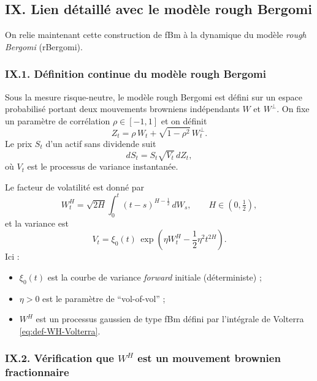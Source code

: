 \documentclass[11pt,a4paper]{article}
\newcommand{\1}{\mathbf{1}}
\begin{document}
\subsection*{IX. Lien détaillé avec le modèle rough Bergomi}

On relie maintenant cette construction de fBm à la dynamique du
modèle \emph{rough Bergomi} (rBergomi).

\subsubsection*{IX.1. Définition continue du modèle rough Bergomi}

Sous la mesure risque-neutre, le modèle rough Bergomi est défini
sur un espace probabilisé portant deux mouvements browniens
indépendants $W$ et $W^\perp$. On fixe un paramètre de corrélation
$\rho\in[-1,1]$ et on définit
\begin{equation}
  Z_t = \rho\,W_t + \sqrt{1-\rho^2}\,W_t^\perp.
\end{equation}
Le prix $S_t$ d'un actif sans dividende suit
\begin{equation}
  dS_t = S_t \sqrt{V_t}\,dZ_t,
\end{equation}
où $V_t$ est le processus de variance instantanée.

Le facteur de volatilité est donné par
\begin{equation}
  \label{eq:def-WH-Volterra}
  W_t^H = \sqrt{2H}\int_0^t (t-s)^{H-\frac12}\,dW_s,
  \qquad H\in(0,\tfrac12),
\end{equation}
et la variance est
\begin{equation}
  \label{eq:def-V-rBergomi}
  V_t = \xi_0(t)\,
        \exp\!\left(
          \eta W_t^H - \frac12 \eta^2 t^{2H}
        \right).
\end{equation}
Ici :
\begin{itemize}
  \item $\xi_0(t)$ est la courbe de variance \emph{forward} initiale
        (déterministe) ;
  \item $\eta>0$ est le paramètre de ``vol-of-vol'' ;
  \item $W^H$ est un processus gaussien de type fBm défini par
        l'intégrale de Volterra \eqref{eq:def-WH-Volterra}.
\end{itemize}

\subsubsection*{IX.2. Vérification que $W^H$ est un mouvement brownien fractionnaire}
\end{document}
